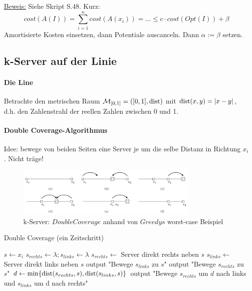 \underline{Beweis:}
Siehe Skript S.48. Kurz:
$$ cost(A(I)) = \sum_{i=1}^n cost(A(x_i)) = \dots \leq c \cdot cost(Opt(I)) + \beta $$
Amortisierte Kosten einsetzen, dann Potentiale auscanceln. Dann $\alpha := \beta$ setzen.

\subsection{k-Server auf der Linie}

\paragraph{Die Line}
Betrachte den metrischen Raum $\mathcal{M}_{[0,1]} = ([0,1], \text{dist})$ mit $\text{dist}(x,y) = |x-y|$,
d.h. den Zahlenstrahl der reellen Zahlen zwischen 0 und 1.

\paragraph{Double Coverage-Algorithmus}
Idee: bewege von beiden Seiten eine Server je um die selbe Distanz in Richtung $x_i$.
Nicht träge!

\begin{figure}[h]
    \centering
    \includegraphics[width=0.8\textwidth]{images/k-server-double-coverage.png}
    \caption{k-Server: $DoubleCoverage$ anhand von $Greedys$ worst-case Beispiel}
    \label{k-server-double-coverage}
\end{figure}

\begin{algorithm}[h]
\caption{Double Coverage (ein Zeitschritt)}
\begin{algorithmic}
    \State $s \gets x_i$
    \State $s_{rechts} \gets \lambda; s_{links} \gets \lambda$
    \State $s_{rechts} \gets $ Server direkt rechts neben $s$
    \State $s_{links} \gets $ Server direkt links neben $s$
        \State output "Bewege $s_{links}$ zu $s$"
    \State output "Bewege $s_{rechts}$ zu $s$"
    \Else
    \State $d \gets \min \{ \text{dist}(s_{rechts} , s), \text{dist}(s_{links} , s) \}$
    \State output "Bewege $s_{rechts}$ um $d$ nach links und $s_{links}$ um d nach rechts"
    \EndIf
\end{algorithmic}
\end{algorithm}

